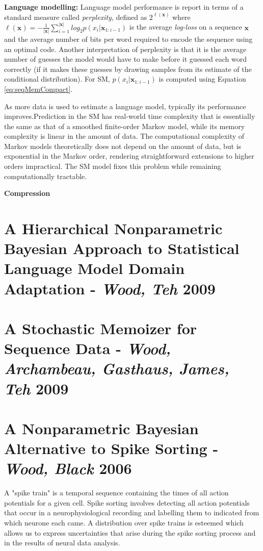\textbf{Language modelling:} Language model performance is report in terms of a standard measure called \textit{perplexity}, defined as $2^{\ell(\boldsymbol x)}$ where $\ell(\boldsymbol x)=-\frac{1}{|\boldsymbol x|}\sum_{i=1}^{|\boldsymbol x|}log_{2}p(x_{i}|\boldsymbol x_{1:i-1})$ is the average \textit{log-loss} on a sequence $\boldsymbol x$ and the average number of bits per word required to encode the sequence using an optimal code. Another interpretation of perplexity is that it is the average number of guesses the model would have to make before it guessed each word correctly (if it makes these guesses by drawing samples from its estimate of the conditional distribution). For SM, $p(x_{i}|\boldsymbol x_{1:i-1})$ is computed using Equation \ref{eq:seqMemCompact}.

As more data is used to estimate a language model, typically its performance improves.Prediction in the SM has real-world time complexity that is essentially the same as that of a smoothed finite-order Markov model, while its memory complexity is linear in the amount of data. The computational complexity of Markov models theoretically does not depend on the amount of data, but is exponential in the Markov order, rendering straightforward extensions to higher orders impractical. The SM model fixes this problem while remaining computationally tractable.

\textbf{Compression}



\section{A Hierarchical Nonparametric Bayesian Approach to Statistical Language Model Domain Adaptation - \textit{Wood, Teh} 2009} \cite{wood2009hierarchical}

\section{A Stochastic Memoizer for Sequence Data - \textit{Wood, Archambeau, Gasthaus, James, Teh} 2009} \cite{wood2009stochastic}

\section{A Nonparametric Bayesian Alternative to Spike Sorting - \textit{Wood, Black} 2006} \cite{wood2008nonparametric}

A "spike train" is a temporal sequence containing the times of all action potentials for a given cell. Spike sorting involves detecting all action potentials that occur in a neurophysiological recording and labelling them to indicated from which neurone each came. A distribution over spike trains is esteemed which allows us to express uncertainties that arise during the spike sorting process and in the results of neural data analysis.

